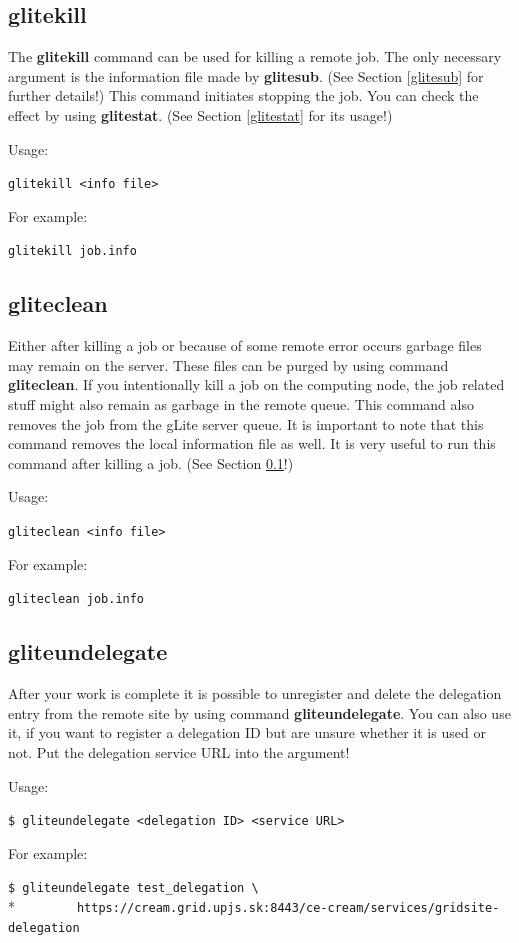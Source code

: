\documentclass{article}
\begin{document}
\subsection{glitekill}
\label{glitekill}
The \textbf{glitekill} command can be used for killing a remote job. The only necessary argument is the information file made by \textbf{glitesub}. (See Section \ref{glitesub} for further details!) This command initiates stopping the job. You can check the effect by using \textbf{glitestat}. (See Section \ref{glitestat} for its usage!)\par
Usage:
\begin{shaded}\verb#glitekill <info file>#\end{shaded}
For example:
\begin{shaded}\verb#glitekill job.info#\end{shaded}
\subsection{gliteclean}
\label{gliteclean}
Either after killing a job or because of some remote error occurs garbage files may remain on the server. These files can be purged by using command \textbf{gliteclean}. If you intentionally kill a job on the computing node, the job related stuff might also remain as garbage in the remote queue. This command also removes the job from the gLite server queue. It is important to note that this command removes the local information file as well. It is very useful to run this command after killing a job. (See Section \ref{glitekill}!)\par
Usage:
\begin{shaded}\verb#gliteclean <info file>#\end{shaded}
For example:
\begin{shaded}\verb#gliteclean job.info#\end{shaded}
\subsection{gliteundelegate}
\label{gliteundelegate}
After your work is complete it is possible to unregister and delete the delegation entry from the remote site by using command \textbf{gliteundelegate}. You can also use it, if you want to register a delegation ID but are unsure whether it is used or not. Put the delegation service URL into the argument!\par
Usage:
\begin{shaded}\verb#$ gliteundelegate <delegation ID> <service URL>#\end{shaded}
For example:
\begin{shaded}\verb#$ gliteundelegate test_delegation \#\\*
\verb#        https://cream.grid.upjs.sk:8443/ce-cream/services/gridsite-delegation#\end{shaded}
\end{document}
